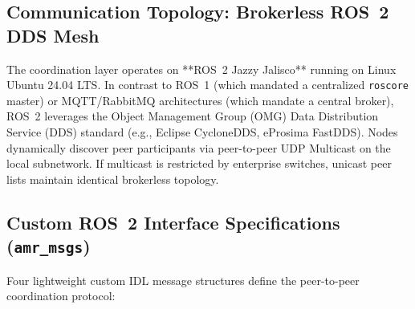 \documentclass[10pt,twocolumn,a4paper]{article}
\theoremstyle{definition}
\begin{document}
\subsection{Communication Topology: Brokerless ROS~2 DDS Mesh}
The coordination layer operates on **ROS~2 Jazzy Jalisco** running on Linux Ubuntu 24.04 LTS. In contrast to ROS~1 (which mandated a centralized \texttt{roscore} master) or MQTT/RabbitMQ architectures (which mandate a central broker), ROS~2 leverages the Object Management Group (OMG) Data Distribution Service (DDS) standard (e.g., Eclipse CycloneDDS, eProsima FastDDS). Nodes dynamically discover peer participants via peer-to-peer UDP Multicast on the local subnetwork. If multicast is restricted by enterprise switches, unicast peer lists maintain identical brokerless topology.

\subsection{Custom ROS~2 Interface Specifications (\texttt{amr\_msgs})}
Four lightweight custom IDL message structures define the peer-to-peer coordination protocol:
\end{document}
